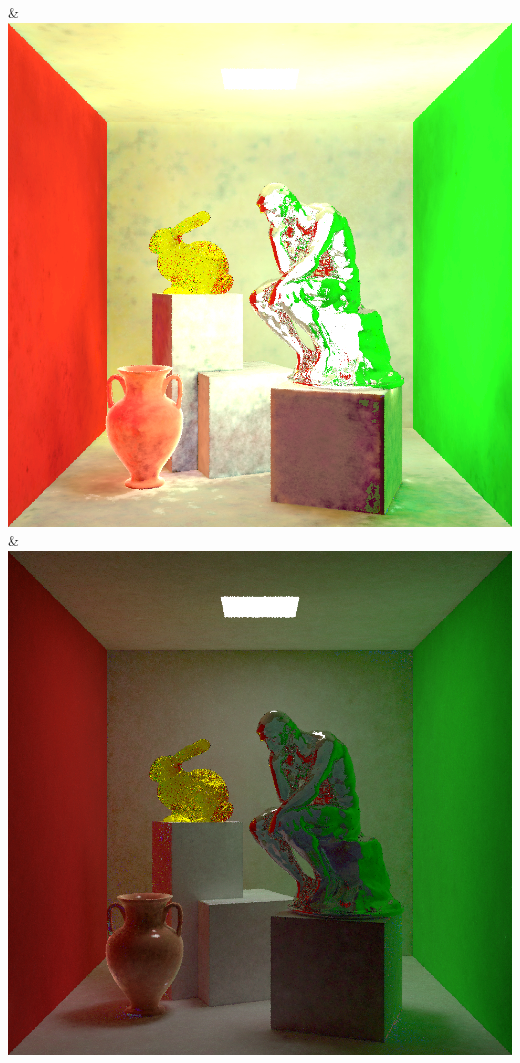& \includegraphics[width=\linewidth]{figures/py/tests/quality_comparison/nrc+lt+bal_1spp_thinker.png}
& \includegraphics[width=\linewidth]{figures/py/tests/quality_comparison/nrc+sppc_1spp_thinker.png}
